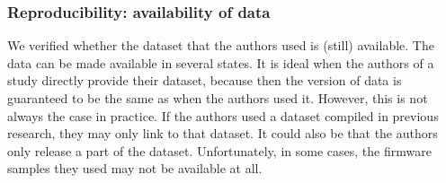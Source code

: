 \subsubsection{Reproducibility: availability of data}
We verified whether the dataset that the authors used is (still) available.
The data can be made available in several states.
It is ideal when the authors of a study directly provide their dataset, because then the version of data is guaranteed to be the same as when the authors used it.
However, this is not always the case in practice.
If the authors used a dataset compiled in previous research, they may only link to that dataset.
It could also be that the authors only release a part of the dataset.
Unfortunately, in some cases, the firmware samples they used may not be available at all.
